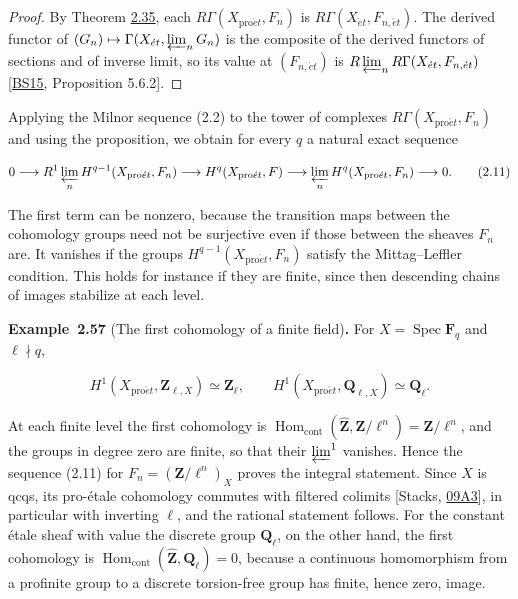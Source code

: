 \documentclass[11pt]{article}
\newenvironment{bpstatement}[2]{\par\addvspace{0.6\baselineskip}\noindent\textbf{#1}#2\textbf{.}\enspace\ignorespaces}
  {\par\addvspace{0.4\baselineskip}}
\begin{document}
\begin{proof}[{Proof}]\label{bp174}%
By Theorem \hyperref[bp101]{2.35}, each \(R\Gamma(X_{\mathrm{pro}\acute{e}t},F_n)\) is \(R\Gamma(X_{\acute{e}t},F_{n,\acute{e}t})\). The derived functor of \((G_n)\mapsto\Gamma(X_{\acute{e}t},\varprojlim_nG_n)\) is the composite of the derived functors of sections and of inverse limit, so its value at \((F_{n,\acute{e}t})\) is \(R\varprojlim_nR\Gamma(X_{\acute{e}t},F_{n,\acute{e}t})\) [\hyperref[bp191]{BS15}, Proposition 5.6.2].
\end{proof}

\label{bp175}%
Applying the Milnor sequence (2.2) to the tower of complexes \(R\Gamma(X_{\mathrm{pro}\acute{e}t},F_n)\) and using the proposition, we obtain for every \(q\) a natural exact sequence

\[
0\longrightarrow R^1\varprojlim_nH^{q-1}(X_{\mathrm{pro}\acute{e}t},F_n)
\longrightarrow H^q(X_{\mathrm{pro}\acute{e}t},F)
\longrightarrow\varprojlim_nH^q(X_{\mathrm{pro}\acute{e}t},F_n)
\longrightarrow0.
\tag{2.11}
\]

The first term can be nonzero, because the transition maps between the cohomology groups need not be surjective even if those between the sheaves \(F_n\) are. It vanishes if the groups \(H^{q-1}(X_{\mathrm{pro}\acute{e}t},F_n)\) satisfy the Mittag–Leffler condition. This holds for instance if they are finite, since then descending chains of images stabilize at each level.

\label{bp176}%
\begin{bpstatement}{Example~2.57}{ (The first cohomology of a finite field)}
For \(X=\operatorname{Spec}\mathbf F_q\) and \(\ell\nmid q\),

\[
H^1(X_{\mathrm{pro}\acute{e}t},\mathbf Z_{\ell,X})\simeq\mathbf Z_\ell,
\qquad H^1(X_{\mathrm{pro}\acute{e}t},\mathbf Q_{\ell,X})\simeq\mathbf Q_\ell.
\]

At each finite level the first cohomology is \(\operatorname{Hom}_{\mathrm{cont}}(\widehat{\mathbf Z},
\mathbf Z/\ell^n)=\mathbf Z/\ell^n\), and the groups in degree zero are finite, so that their \(\varprojlim^1\) vanishes. Hence the sequence (2.11) for \(F_n=(\mathbf Z/\ell^n)_X\) proves the integral statement. Since \(X\) is qcqs, its pro-étale cohomology commutes with filtered colimits [Stacks, \href{https://stacks.math.columbia.edu/tag/09A3}{09A3}], in particular with inverting \(\ell\), and the rational statement follows. For the constant étale sheaf with value the discrete group \(\mathbf Q_\ell\), on the other hand, the first cohomology is \(\operatorname{Hom}_{\mathrm{cont}}(\widehat{\mathbf Z},\mathbf Q_\ell)=0\), because a continuous homomorphism from a profinite group to a discrete torsion-free group has finite, hence zero, image.
\end{bpstatement}
\end{document}
